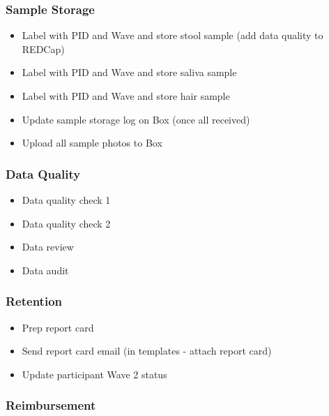 \documentclass[]{book}
\providecommand{\tightlist}{%
  \setlength{\itemsep}{0pt}\setlength{\parskip}{0pt}}
\begin{document}
\hypertarget{sample-storage-2}{%
\subsubsection{Sample Storage}\label{sample-storage-2}}

\begin{itemize}
\tightlist
\item
  Label with PID and Wave and store stool sample (add data quality to REDCap)
\item
  Label with PID and Wave and store saliva sample
\item
  Label with PID and Wave and store hair sample
\item
  Update sample storage log on Box (once all received)
\item
  Upload all sample photos to Box
\end{itemize}

\hypertarget{data-quality-1}{%
\subsubsection{Data Quality}\label{data-quality-1}}

\begin{itemize}
\tightlist
\item
  Data quality check 1
\item
  Data quality check 2
\item
  Data review
\item
  Data audit
\end{itemize}

\hypertarget{retention-1}{%
\subsubsection{Retention}\label{retention-1}}

\begin{itemize}
\tightlist
\item
  Prep report card
\item
  Send report card email (in templates - attach report card)
\item
  Update participant Wave 2 status
\end{itemize}

\hypertarget{reimbursement-1}{%
\subsubsection{Reimbursement}\label{reimbursement-1}}
\end{document}
